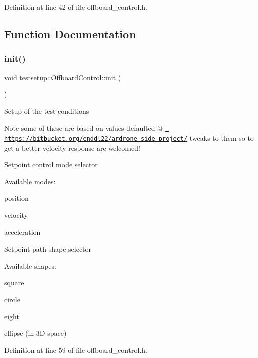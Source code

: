 Definition at line 42 of file offboard\+\_\+control.\+h.



\subsection{Function Documentation}
\mbox{\label{group__sitl__test_ga96ffcf517eede8e7fca2a9f156a88544}} 
\subsubsection{\texorpdfstring{init()}{init()}}
{\footnotesize\ttfamily void testsetup\+::\+Offboard\+Control\+::init (\begin{DoxyParamCaption}{ }\end{DoxyParamCaption})\hspace{0.3cm}{\ttfamily [inline]}}

Setup of the test conditions

\begin{DoxyNote}{Note}
some of these are based on values defaulted @ \href{https://bitbucket.org/enddl22/ardrone_side_project/}{\texttt{ https\+://bitbucket.\+org/enddl22/ardrone\+\_\+side\+\_\+project/}} tweaks to them so to get a better velocity response are welcomed!
\end{DoxyNote}
Setpoint control mode selector

Available modes\+:
\begin{DoxyItemize}
\item position
\item velocity
\item acceleration
\end{DoxyItemize}

Setpoint path shape selector

Available shapes\+:
\begin{DoxyItemize}
\item square
\item circle
\item eight
\item ellipse (in 3D space)
\end{DoxyItemize}

Definition at line 59 of file offboard\+\_\+control.\+h.

\mbox{\label{group__sitl__test_ga069b39408b92308e5a160e6da217a76d}} 
